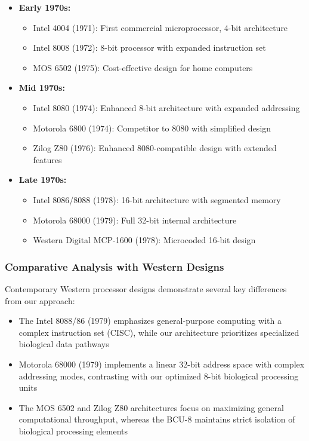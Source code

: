 \documentclass[12pt]{article}
\begin{document}
\begin{itemize}
    \item \textbf{Early 1970s:}
        \begin{itemize}
            \item Intel 4004 (1971): First commercial microprocessor, 4-bit architecture
            \item Intel 8008 (1972): 8-bit processor with expanded instruction set
            \item MOS 6502 (1975): Cost-effective design for home computers
        \end{itemize}
    \item \textbf{Mid 1970s:}
        \begin{itemize}
            \item Intel 8080 (1974): Enhanced 8-bit architecture with expanded addressing
            \item Motorola 6800 (1974): Competitor to 8080 with simplified design
            \item Zilog Z80 (1976): Enhanced 8080-compatible design with extended features
        \end{itemize}
    \item \textbf{Late 1970s:}
        \begin{itemize}
            \item Intel 8086/8088 (1978): 16-bit architecture with segmented memory
            \item Motorola 68000 (1979): Full 32-bit internal architecture
            \item Western Digital MCP-1600 (1978): Microcoded 16-bit design
        \end{itemize}
\end{itemize}

\subsubsection{Comparative Analysis with Western Designs}
Contemporary Western processor designs demonstrate several key differences from our approach:

\begin{itemize}
    \item The Intel 8088/86 (1979) emphasizes general-purpose computing with a complex instruction set (CISC), while our architecture prioritizes specialized biological data pathways
    \item Motorola 68000 (1979) implements a linear 32-bit address space with complex addressing modes, contrasting with our optimized 8-bit biological processing units
    \item The MOS 6502 and Zilog Z80 architectures focus on maximizing general computational throughput, whereas the BCU-8 maintains strict isolation of biological processing elements
\end{itemize}
\end{document}
